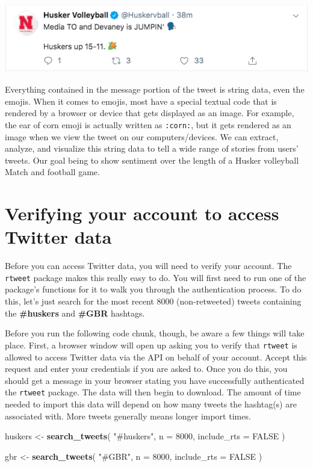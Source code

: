 \documentclass[]{book}
\newenvironment{Shaded}{\begin{snugshade}}{\end{snugshade}}
\newcommand{\DataTypeTok}[1]{\textcolor[rgb]{0.13,0.29,0.53}{#1}}
\newcommand{\DecValTok}[1]{\textcolor[rgb]{0.00,0.00,0.81}{#1}}
\newcommand{\KeywordTok}[1]{\textcolor[rgb]{0.13,0.29,0.53}{\textbf{#1}}}
\newcommand{\NormalTok}[1]{#1}
\newcommand{\OtherTok}[1]{\textcolor[rgb]{0.56,0.35,0.01}{#1}}
\newcommand{\StringTok}[1]{\textcolor[rgb]{0.31,0.60,0.02}{#1}}
\begin{document}
\includegraphics[width=7.53in]{images/volleyballTweet}

Everything contained in the message portion of the tweet is string data, even the emojis. When it comes to emojis, most have a special textual code that is rendered by a browser or device that gets displayed as an image. For example, the ear of corn emoji is actually written as \texttt{:corn:}, but it gets rendered as an image when we view the tweet on our computers/devices. We can extract, analyze, and visualize this string data to tell a wide range of stories from users' tweets. Our goal being to show sentiment over the length of a Husker volleyball Match and football game.

\hypertarget{verifying-your-account-to-access-twitter-data}{%
\section{Verifying your account to access Twitter data}\label{verifying-your-account-to-access-twitter-data}}

Before you can access Twitter data, you will need to verify your account. The \texttt{rtweet} package makes this really easy to do. You will first need to run one of the package's functions for it to walk you through the authentication process. To do this, let's just search for the most recent 8000 (non-retweeted) tweets containing the \textbf{\#huskers} and \textbf{\#GBR} hashtags.

Before you run the following code chunk, though, be aware a few things will take place. First, a browser window will open up asking you to verify that \texttt{rtweet} is allowed to access Twitter data via the API on behalf of your account. Accept this request and enter your credentials if you are asked to. Once you do this, you should get a message in your browser stating you have successfully authenticated the \texttt{rtweet} package. The data will then begin to download. The amount of time needed to import this data will depend on how many tweets the hashtag(s) are associated with. More tweets generally means longer import times.

\begin{Shaded}
\begin{Highlighting}[]
\NormalTok{huskers <-}\StringTok{ }\KeywordTok{search_tweets}\NormalTok{(}
  \StringTok{"#huskers"}\NormalTok{, }\DataTypeTok{n =} \DecValTok{8000}\NormalTok{, }\DataTypeTok{include_rts =} \OtherTok{FALSE}
\NormalTok{)}

\NormalTok{gbr <-}\StringTok{ }\KeywordTok{search_tweets}\NormalTok{(}
  \StringTok{"#GBR"}\NormalTok{, }\DataTypeTok{n =} \DecValTok{8000}\NormalTok{, }\DataTypeTok{include_rts =} \OtherTok{FALSE}
\NormalTok{)}
\end{Highlighting}
\end{Shaded}
\end{document}
